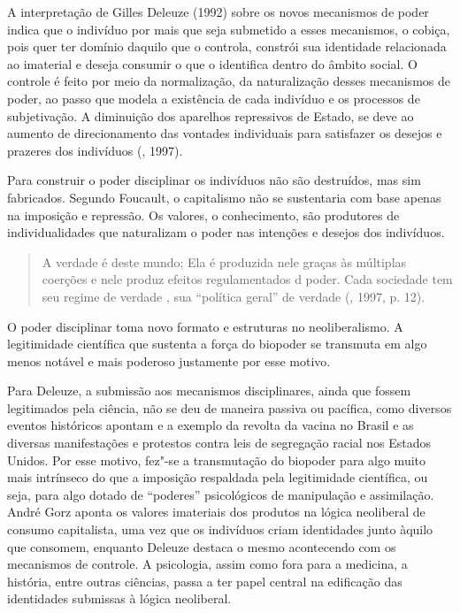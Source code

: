 A interpretação de Gilles Deleuze (1992) sobre os novos mecanismos de
poder indica que o indivíduo por mais que seja submetido a esses
mecanismos, o cobiça, pois quer ter domínio daquilo que o controla,
constrói sua identidade relacionada ao imaterial e deseja consumir o que
o identifica dentro do âmbito social. O controle é feito por meio da
normalização, da naturalização desses mecanismos de poder, ao passo que
modela a existência de cada indivíduo e os processos de subjetivação. A
diminuição dos aparelhos repressivos de Estado, se deve ao aumento de
direcionamento das vontades individuais para satisfazer os desejos e
prazeres dos indivíduos (, 1997).

Para construir o poder disciplinar os indivíduos não são destruídos,
mas sim fabricados. Segundo Foucault, o capitalismo não se sustentaria
com base apenas na imposição e repressão. Os valores, o conhecimento,
são produtores de individualidades que naturalizam o poder nas intenções
e desejos dos indivíduos.

\begin{quote}
A verdade é deste mundo; Ela é produzida nele graças às múltiplas
coerções e nele produz efeitos regulamentados d poder. Cada sociedade
tem seu regime de verdade , sua ``política geral'' de verdade
(, 1997, p. 12).
\end{quote}

O poder disciplinar toma novo formato e estruturas no neoliberalismo. A
legitimidade científica que sustenta a força do biopoder se transmuta em
algo menos notável e mais poderoso justamente por esse motivo.

Para Deleuze, a submissão aos mecanismos disciplinares, ainda que fossem
legitimados pela ciência, não se deu de maneira passiva ou pacífica,
como diversos eventos históricos apontam e a exemplo da revolta da
vacina no Brasil e as diversas manifestações e protestos contra leis de
segregação racial nos Estados Unidos. Por esse motivo, fez"-se a
transmutação do biopoder para algo muito mais intrínseco do que a
imposição respaldada pela legitimidade científica, ou seja, para algo
dotado de ``poderes'' psicológicos de manipulação e assimilação. André
Gorz aponta os valores imateriais dos produtos na lógica neoliberal de
consumo capitalista, uma vez que os indivíduos criam identidades junto
àquilo que consomem, enquanto Deleuze destaca o mesmo acontecendo com os
mecanismos de controle. A psicologia, assim como fora para a medicina, a
história, entre outras ciências, passa a ter papel central na edificação
das identidades submissas à lógica neoliberal.

